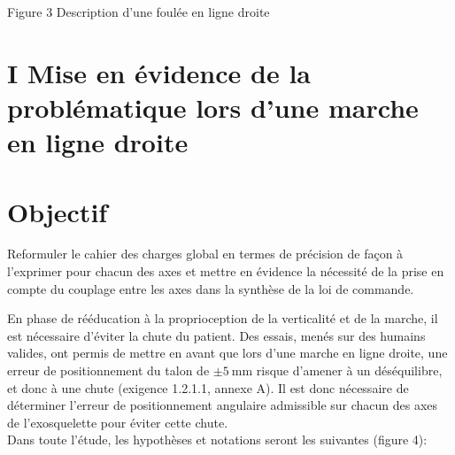 \documentclass[10pt]{article}
\begin{document}
Figure 3 Description d'une foulée en ligne droite

\section*{I Mise en évidence de la problématique lors d'une marche en ligne droite}
\section*{Objectif}
Reformuler le cahier des charges global en termes de précision de façon à l'exprimer pour chacun des axes et mettre en évidence la nécessité de la prise en compte du couplage entre les axes dans la synthèse de la loi de commande.

En phase de rééducation à la proprioception de la verticalité et de la marche, il est nécessaire d'éviter la chute du patient. Des essais, menés sur des humains valides, ont permis de mettre en avant que lors d'une marche en ligne droite, une erreur de positionnement du talon de $\pm 5 \mathrm{~mm}$ risque d'amener à un déséquilibre, et donc à une chute (exigence 1.2.1.1, annexe A). Il est donc nécessaire de déterminer l'erreur de positionnement angulaire admissible sur chacun des axes de l'exosquelette pour éviter cette chute.\\
Dans toute l'étude, les hypothèses et notations seront les suivantes (figure 4):
\end{document}
